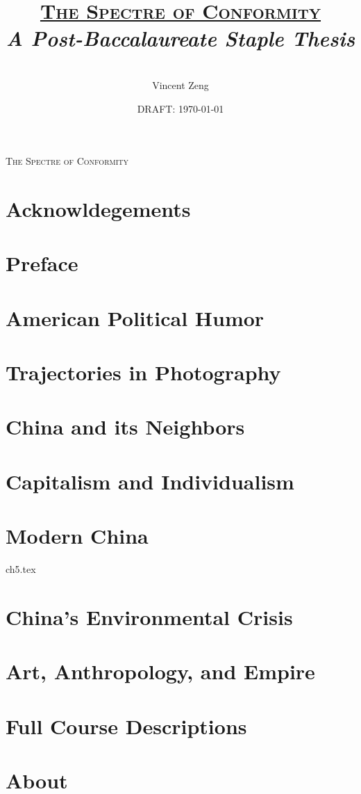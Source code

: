 \documentclass[12pt,twoside,openany]{book}
\title{\Huge\textsc{\underline{The Spectre of Conformity}}\\
\null
\Large{\textit{A Post-Baccalaureate Staple Thesis}}}
\author{\null\\
Vincent Zeng}
\date{DRAFT: \today}
\begin{document}
\thispagestyle{empty}

{\Huge\textsc{The Spectre of Conformity}}{\Huge}



\maketitle

\blankpage

\frontmatter
\chapter{Acknowldegements}


\tableofcontents

\blankpage

\chapter{Preface}
\null
\null
\null


\blankpage
\blankpage

\mainmatter

\chapter{American Political Humor}


\chapter{Trajectories in Photography}


\chapter{China and its Neighbors}


\chapter{Capitalism and Individualism}


\chapter{Modern China}
 {ch5.tex}

\chapter{China's Environmental Crisis}


\chapter{Art, Anthropology, and Empire}


\appendix

\chapter{Full Course Descriptions}


\blankpage
\blankpage
\blankpage
\chapter*{About}

\end{document}
